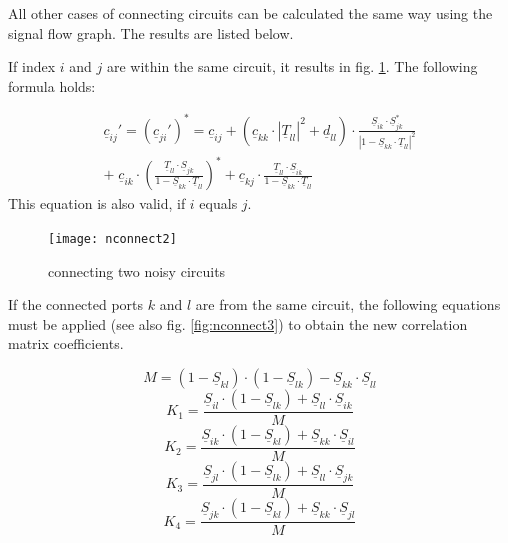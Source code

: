 \documentclass[10pt]{report}
\begin{document}
All other cases of connecting circuits can be calculated the same way
using the signal flow graph.  The results are listed below.

\addvspace{12pt}

If index $i$ and $j$ are within the same circuit, it results in
fig. \ref{fig:nconnect2}.  The following formula holds:

\begin{equation}
\begin{split}
\underline{c}_{ij}' = (\underline{c}_{ji}')^* = \underline{c}_{ij} +
   (\underline{c}_{kk}\cdot|\underline{T}_{ll}|^2 + \underline{d}_{ll})\cdot
   \frac{\underline{S}_{ik}\cdot\underline{S}_{jk}^*}{|1-\underline{S}_{kk}\cdot\underline{T}_{ll}|^2}
\\ + \;\underline{c}_{ik}\cdot
     \left(\frac{\underline{T}_{ll}\cdot\underline{S}_{jk}}
                {1-\underline{S}_{kk}\cdot\underline{T}_{ll}}\right)^*
   + \underline{c}_{kj}\cdot
     \frac{\underline{T}_{ll}\cdot\underline{S}_{ik}}{1-\underline{S}_{kk}\cdot\underline{T}_{ll}}
\end{split}
\end{equation}
This equation is also valid, if $i$ equals $j$.

\begin{figure}[ht]
\begin{center}
\texttt{[image: nconnect2]}
\end{center}
\caption{connecting two noisy circuits}
\label{fig:nconnect2}
\end{figure}
\FloatBarrier


If the connected ports $k$ and $l$ are from the same circuit, the
following equations must be applied (see also
fig. \ref{fig:nconnect3}) to obtain the new correlation matrix
coefficients.

\begin{equation}
M = (1-\underline{S}_{kl})\cdot(1-\underline{S}_{lk}) - \underline{S}_{kk}\cdot\underline{S}_{ll}
\end{equation}
\begin{equation}
K_1 = \frac{\underline{S}_{il}\cdot(1-\underline{S}_{lk}) + \underline{S}_{ll}\cdot\underline{S}_{ik}} {M}
\end{equation}
\begin{equation}
K_2 = \frac{\underline{S}_{ik}\cdot(1-\underline{S}_{kl}) + \underline{S}_{kk}\cdot\underline{S}_{il}} {M}
\end{equation}
\begin{equation}
K_3 = \frac{\underline{S}_{jl}\cdot(1-\underline{S}_{lk}) + \underline{S}_{ll}\cdot\underline{S}_{jk}} {M}
\end{equation}
\begin{equation}
K_4 = \frac{\underline{S}_{jk}\cdot(1-\underline{S}_{kl}) + \underline{S}_{kk}\cdot\underline{S}_{jl}} {M}
\end{equation}
\end{document}
